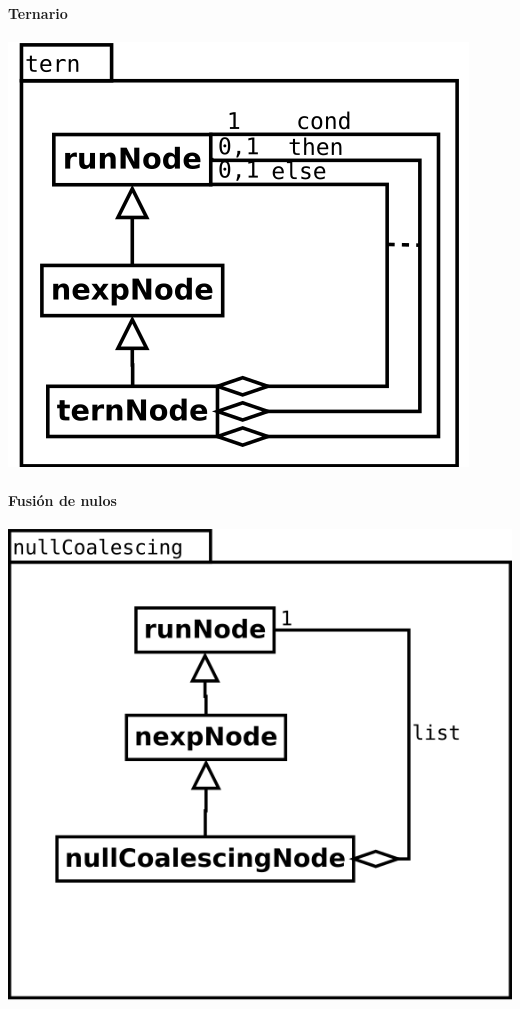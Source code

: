 \paragraph {Ternario} 
\begin{center}
\includegraphics[scale=0.4]{tern.png} \\
\end{center}

\paragraph {Fusión de nulos} 
\begin{center}
\includegraphics[scale=0.4]{nullCoalescing.png} \\
\end{center}

